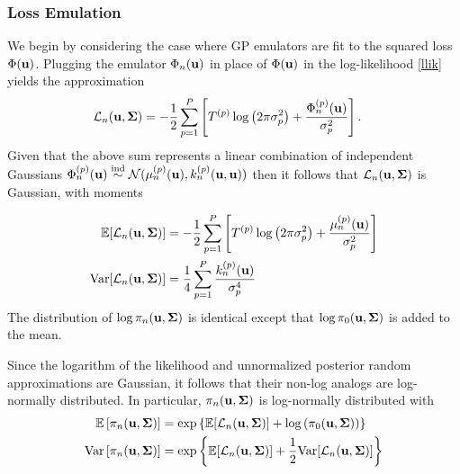 \documentclass[12pt]{article}
\begin{document}
\subsubsection{Loss Emulation}
We begin by considering the case where GP emulators are fit to the squared loss $\Phi(\mathbf{u})$.
Plugging the emulator $\Phi_n(\mathbf{u})$ in place of $\Phi(\mathbf{u})$ in the log-likelihood
\ref{llik} yields the approximation 
\begin{align*}
\mathcal{L}_{n}(\mathbf{u}, \boldsymbol{\Sigma}) &= -\frac{1}{2} \sum_{p = 1}^{P} \left[{T}^{(p)} \log\left(2\pi \sigma_{p}^2 \right) + \frac{{\Phi}^{(p)}_{n}(\mathbf{u})}{\sigma_{p}^2} \right].
\end{align*}
Given that the above sum represents a linear combination of independent Gaussians 
${\Phi}^{(p)}_{n}(\mathbf{u}) \overset{\text{ind}}{\sim} \mathcal{N}(\mu_{n}^{(p)}(\mathbf{u}), k_{n}^{(p)}(\mathbf{u}, \mathbf{u}))$ then it follows that 
$\mathcal{L}_{n}(\mathbf{u}, \boldsymbol{\Sigma})$ is Gaussian, with moments 

\begin{align}
\mathbb{E}[\mathcal{L}_{n}(\mathbf{u}, \boldsymbol{\Sigma})] &= -\frac{1}{2} \sum_{p = 1}^{P} \left[{T}^{(p)} \log\left(2\pi \sigma_{p}^2 \right) + \frac{\mu_{n}^{(p)}(\mathbf{u})}{\sigma_{p}^2} \right] \label{llik_approx_mean} \\
\mathrm{Var}[\mathcal{L}_{n}(\mathbf{u}, \boldsymbol{\Sigma})] &= \frac{1}{4} \sum_{p = 1}^{P} \frac{k_{n}^{(p)}(\mathbf{u})}{\sigma_{p}^4} \label{llik_approx_var}
\end{align}
The distribution of $\log \pi_{n}(\mathbf{u}, \boldsymbol{\Sigma})$ is identical except that $\log \pi_0(\mathbf{u}, \boldsymbol{\Sigma})$ is added to the mean. 

Since the logarithm of the likelihood and unnormalized posterior random approximations are Gaussian, it follows that their non-log analogs are log-normally distributed.
In particular, $\pi_{n}(\mathbf{u}, \boldsymbol{\Sigma})$ is log-normally distributed with 
\begin{align}
\mathbb{E}\left[\pi_{n}(\mathbf{u}, \boldsymbol{\Sigma})\right] &= \exp\left\{\mathbb{E}[\mathcal{L}_{n}(\mathbf{u}, \boldsymbol{\Sigma})] + \log\left(\pi_0(\mathbf{u}, \boldsymbol{\Sigma})\right) \right\} \\
\mathrm{Var}\left[\pi_{n}(\mathbf{u}, \boldsymbol{\Sigma})\right] &= \exp\left\{\mathbb{E}[\mathcal{L}_{n}(\mathbf{u}, \boldsymbol{\Sigma})] + \frac{1}{2}\mathrm{Var}[\mathcal{L}_{n}(\mathbf{u}, \boldsymbol{\Sigma})] \right\} \label{post_approx_var}
\end{align}
\end{document}

